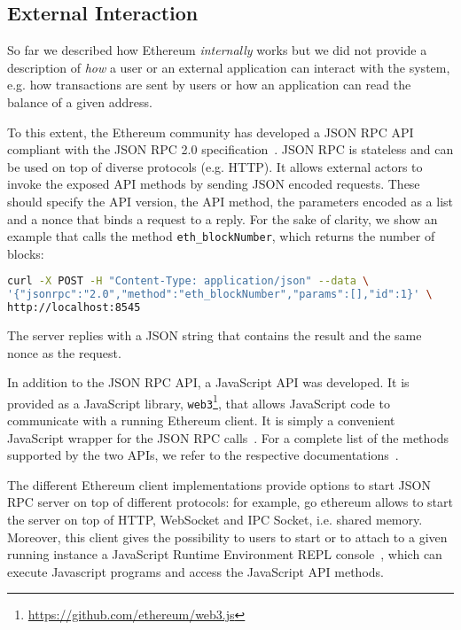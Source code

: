 \subsection{External Interaction}

So far we described how Ethereum \emph{internally} works but we did not provide
a description of \emph{how} a user or an external application can interact with
the system, e.g. how transactions are sent by users or how an application can
read the balance of a given address.

To this extent, the Ethereum community has developed a JSON RPC
API~\cite{bib:json-rpc} compliant with the JSON RPC 2.0
specification~\cite{bib:json2012json}. JSON RPC is stateless and can be used on
top of diverse protocols (e.g. HTTP). It allows external actors to invoke the
exposed API methods by sending JSON encoded requests. These should specify the
API version, the API method, the parameters encoded as a list and a nonce that
binds a request to a reply. For the sake of clarity, we show an example that
calls the method \verb|eth_blockNumber|, which returns the number of blocks:

\begin{lstlisting}[language=bash]
curl -X POST -H "Content-Type: application/json" --data \
'{"jsonrpc":"2.0","method":"eth_blockNumber","params":[],"id":1}' \
http://localhost:8545
\end{lstlisting}

The server replies with a JSON string that contains the result and the same
nonce as the request.

In addition to the JSON RPC API, a JavaScript API was developed. It is provided
as a JavaScript library,
\texttt{web3}\footnote{\url{https://github.com/ethereum/web3.js}}, that allows
JavaScript code to communicate with a running Ethereum client. It is simply a
convenient JavaScript wrapper for the JSON RPC calls~\cite{bib:javascript-api}.
For a complete list of the methods supported by the two APIs, we refer to the
respective documentations~\cite{bib:json-rpc, bib:javascript-api}.

The different Ethereum client implementations provide options to start JSON RPC
server on top of different protocols: for example, go ethereum allows to start
the server on top of HTTP, WebSocket and IPC Socket, i.e. shared memory.
Moreover, this client gives the possibility to users to start or to attach to a
given running instance a JavaScript Runtime Environment REPL
console~\cite{bib:js-console}, which can execute Javascript programs and access
the JavaScript API methods.
